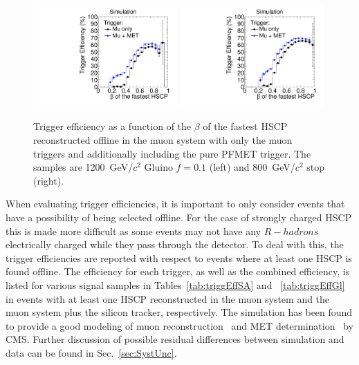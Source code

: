 \begin{figure}
\centering
  \includegraphics[clip=false, trim=0.0cm 0cm 0.0cm 0cm, width=0.49\textwidth]{figures/search/Gluino_8TeV_M1200_f10MatchedSA}
  \includegraphics[clip=false, trim=0.0cm 0cm 0.0cm 0cm, width=0.49\textwidth]{figures/search/Stop_8TeV_M800MatchedSA}
      \caption[Trigger efficiency as a function of the $\beta$ of the fastest HSCP reconstructed offline in the muon system with only the muon triggers
and additionally including the PFMET trigger.]
{Trigger efficiency as a function of the $\beta$ of the fastest HSCP reconstructed offline in the muon system with only the muon triggers
and additionally including the pure PFMET trigger.
The samples are 1200~GeV/$c^2$ Gluino $f=0.1$ (left) and 800~GeV/$c^2$ stop (right).}
    \label{fig:TriggerEffVsBetaGl}
\end{figure}

When evaluating trigger efficiencies, it is important to only consider events that have a possibility of being selected offline.
For the case of strongly charged HSCP this is made more difficult as some events may not have any $R-hadrons$ electrically charged while they pass through the detector.
To deal with this, the trigger efficiencies are reported with respect to events where at least one HSCP is found offline.
The efficiency for each trigger, as well as the combined efficiency, is listed for various signal samples in Tables~\ref{tab:triggEffSA} and ~\ref{tab:triggEffGl} in events
with at least one HSCP reconstructed in the muon system and the muon system plus the silicon tracker, respectively. The simulation has been found to 
provide a good modeling of  muon reconstruction~\cite{2012JInst...7P0002T} and MET determination~\cite{CMS-PAS-JME-12-002} by CMS.
Further discussion of possible residual differences between simulation and data can be found in Sec.~\ref{sec:SystUnc}.

